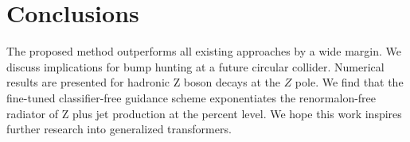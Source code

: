 \section{Conclusions}\label{sec:conclusions}

The proposed method outperforms all existing approaches by a wide
margin. We discuss implications for bump hunting at a future circular
collider. Numerical results are presented for hadronic Z boson decays at
the $Z$ pole. We find that the fine-tuned classifier-free guidance
scheme exponentiates the renormalon-free radiator of Z plus jet
production at the percent level. We hope this work inspires further
research into generalized transformers.

